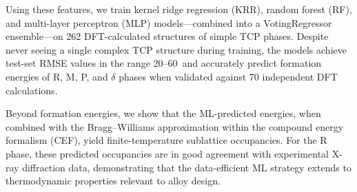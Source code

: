 Using these features, we train kernel ridge regression (KRR), random forest (RF), and multi-layer perceptron (MLP) models---combined into a VotingRegressor ensemble---on 262 DFT-calculated structures of simple TCP phases. Despite never seeing a single complex TCP structure during training, the models achieve test-set RMSE values in the range 20--60~\meVat and accurately predict formation energies of R, M, P, and $\delta$ phases when validated against 70 independent DFT calculations.

Beyond formation energies, we show that the ML-predicted energies, when combined with the Bragg--Williams approximation within the compound energy formalism (CEF), yield finite-temperature sublattice occupancies. For the R phase, these predicted occupancies are in good agreement with experimental X-ray diffraction data, demonstrating that the data-efficient ML strategy extends to thermodynamic properties relevant to alloy design.
